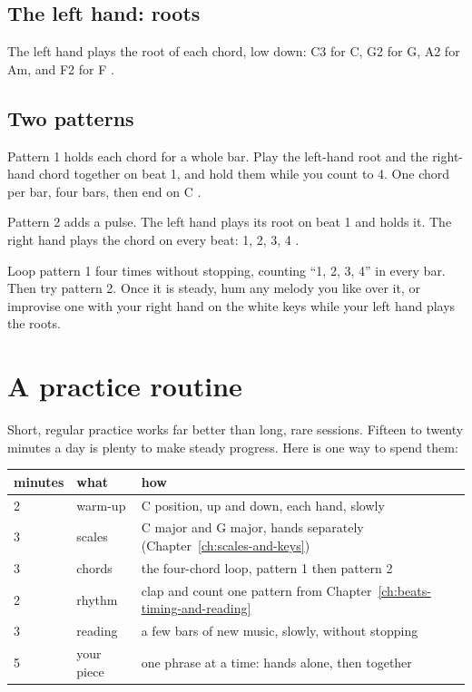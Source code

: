 \subsection*{The left hand: roots}

The left hand plays the root of each chord, low down: C3 for C, G2 for G, A2 for Am, and F2 for F .

\subsection*{Two patterns}

Pattern 1 holds each chord for a whole bar. Play the left-hand root and the right-hand chord together on beat 1, and hold them while you count to 4. One chord per bar, four bars, then end on C .

Pattern 2 adds a pulse. The left hand plays its root on beat 1 and holds it. The right hand plays the chord on every beat: 1, 2, 3, 4 .

\begin{tryitbox}
Loop pattern 1 four times without stopping, counting ``1, 2, 3, 4'' in every bar. Then try pattern 2. Once it is steady, hum any melody you like over it, or improvise one with your right hand on the white keys while your left hand plays the roots.
\end{tryitbox}

\section{A practice routine}

Short, regular practice works far better than long, rare sessions. Fifteen to twenty minutes a day is plenty to make steady progress. Here is one way to spend them:

\begin{center}
\begin{tabular}{lll}
\toprule
minutes & what & how \\
\midrule
2 & warm-up & C position, up and down, each hand, slowly \\
3 & scales & C major and G major, hands separately (Chapter~\ref{ch:scales-and-keys}) \\
3 & chords & the four-chord loop, pattern 1 then pattern 2 \\
2 & rhythm & clap and count one pattern from Chapter~\ref{ch:beats-timing-and-reading} \\
3 & reading & a few bars of new music, slowly, without stopping \\
5 & your piece & one phrase at a time: hands alone, then together \\
\bottomrule
\end{tabular}
\end{center}

